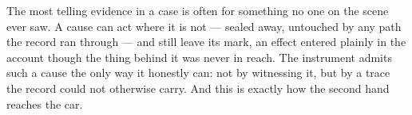%
%
%
%
%

\noindent The most telling evidence in a case is often for something no one on the scene ever saw. A cause can
act where it is not --- sealed away, untouched by any path the record ran through --- and still leave its mark,
an effect entered plainly in the account though the thing behind it was never in reach. The instrument admits
such a cause the only way it honestly can: not by witnessing it, but by a trace the record could not otherwise
carry. And this is exactly how the second hand reaches the car.

